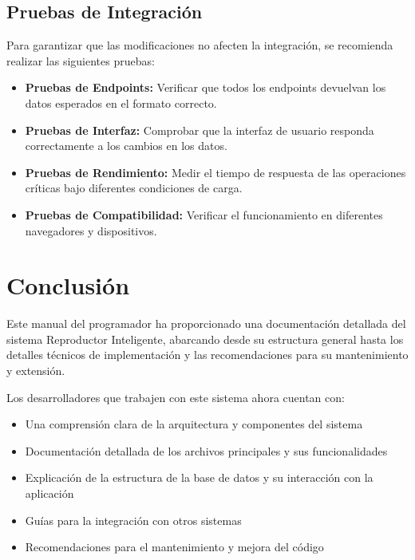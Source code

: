 \documentclass[a4paper,12pt]{article}
\begin{document}
\subsection{Pruebas de Integración}
Para garantizar que las modificaciones no afecten la integración, se recomienda realizar las siguientes pruebas:

\begin{itemize}
    \item \textbf{Pruebas de Endpoints:} Verificar que todos los endpoints devuelvan los datos esperados en el formato correcto.
    
    \item \textbf{Pruebas de Interfaz:} Comprobar que la interfaz de usuario responda correctamente a los cambios en los datos.
    
    \item \textbf{Pruebas de Rendimiento:} Medir el tiempo de respuesta de las operaciones críticas bajo diferentes condiciones de carga.
    
    \item \textbf{Pruebas de Compatibilidad:} Verificar el funcionamiento en diferentes navegadores y dispositivos.
\end{itemize}

\section{Conclusión}
Este manual del programador ha proporcionado una documentación detallada del sistema Reproductor Inteligente, abarcando desde su estructura general hasta los detalles técnicos de implementación y las recomendaciones para su mantenimiento y extensión.

Los desarrolladores que trabajen con este sistema ahora cuentan con:

\begin{itemize}
    \item Una comprensión clara de la arquitectura y componentes del sistema
    \item Documentación detallada de los archivos principales y sus funcionalidades
    \item Explicación de la estructura de la base de datos y su interacción con la aplicación
    \item Guías para la integración con otros sistemas
    \item Recomendaciones para el mantenimiento y mejora del código
\end{itemize}
\end{document}
